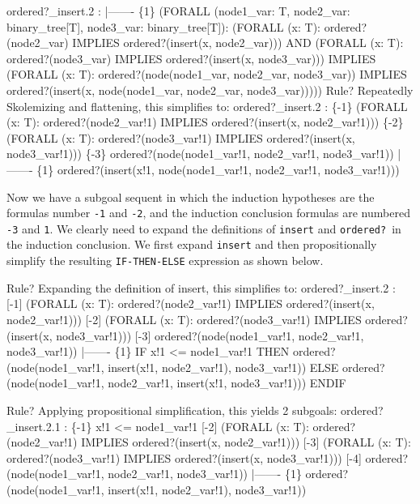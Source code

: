 \documentclass[11pt,twoside]{book}
\begin{document}
\begin{session*}
ordered?_insert.2 :  
  |-------
\{1\}   (FORALL (node1_var: T, node2_var: binary_tree[T],
               node3_var: binary_tree[T]):
         (FORALL (x: T):
            ordered?(node2_var) IMPLIES ordered?(insert(x, node2_var)))
             AND
           (FORALL (x: T):
              ordered?(node3_var) IMPLIES ordered?(insert(x, node3_var)))
             IMPLIES
           (FORALL (x: T):
              ordered?(node(node1_var, node2_var, node3_var))
                  IMPLIES
                ordered?(insert(x, node(node1_var, node2_var, node3_var)))))
Rule? 
Repeatedly Skolemizing and flattening,
this simplifies to: 
ordered?_insert.2 :  
\{-1\}   (FORALL (x: T):
         ordered?(node2_var!1) IMPLIES ordered?(insert(x, node2_var!1)))
\{-2\}   (FORALL (x: T):
         ordered?(node3_var!1) IMPLIES ordered?(insert(x, node3_var!1)))
\{-3\}   ordered?(node(node1_var!1, node2_var!1, node3_var!1))
  |-------
\{1\}   ordered?(insert(x!1, node(node1_var!1, node2_var!1, node3_var!1)))
\end{session*}
Now we have a subgoal sequent in which the induction hypotheses are
the formulas number \texttt{-1} and \texttt{-2}, and the induction
conclusion formulas are numbered \texttt{-3} and \texttt{1}.  We
clearly need to expand the definitions of \texttt{insert} and \texttt{ordered?}\ in the induction conclusion.  We first expand \texttt{insert}
and then propositionally simplify the resulting \texttt{IF-THEN-ELSE}
expression as shown below.
\begin{session*}
Rule? 
Expanding the definition of insert,
this simplifies to: 
ordered?_insert.2 :  
[-1]   (FORALL (x: T):
         ordered?(node2_var!1) IMPLIES ordered?(insert(x, node2_var!1)))
[-2]   (FORALL (x: T):
         ordered?(node3_var!1) IMPLIES ordered?(insert(x, node3_var!1)))
[-3]   ordered?(node(node1_var!1, node2_var!1, node3_var!1))
  |-------
\{1\}   IF x!1 <= node1_var!1
        THEN ordered?(node(node1_var!1, insert(x!1, node2_var!1), node3_var!1))
      ELSE ordered?(node(node1_var!1, node2_var!1, insert(x!1, node3_var!1)))
      ENDIF

Rule? 
Applying propositional simplification,
this yields  2 subgoals: 
ordered?_insert.2.1 :  
\{-1\}   x!1 <= node1_var!1
[-2]   (FORALL (x: T):
         ordered?(node2_var!1) IMPLIES ordered?(insert(x, node2_var!1)))
[-3]   (FORALL (x: T):
         ordered?(node3_var!1) IMPLIES ordered?(insert(x, node3_var!1)))
[-4]   ordered?(node(node1_var!1, node2_var!1, node3_var!1))
  |-------
\{1\}   ordered?(node(node1_var!1, insert(x!1, node2_var!1), node3_var!1))
\end{session*}
\end{document}
